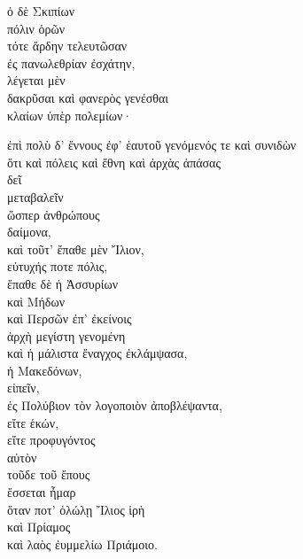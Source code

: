 {\large
\begin{greek}
\noindent  ὁ δὲ Σκιπίων \\
\tabto{2em} πόλιν ὁρῶν\\
\tabto{4em} τότε ἄρδην τελευτῶσαν \\
\tabto{6em} ἐς πανωλεθρίαν ἐσχάτην, \\
λέγεται μὲν \\
\tabto{2em} δακρῦσαι καὶ φανερὸς γενέσθαι \\
\tabto{4em} κλαίων ὑπὲρ πολεμίων·

\tabto{4em} ἐπὶ πολὺ δ' ἔννους ἐφ' ἑαυτοῦ γενόμενός τε καὶ συνιδὼν \\
\tabto{6em} ὅτι καὶ πόλεις καὶ ἔθνη καὶ ἀρχὰς ἁπάσας \\
\tabto{6em} δεῖ \\
\tabto{6em} μεταβαλεῖν \\
\tabto{8em} ὥσπερ ἀνθρώπους \\
\tabto{6em} δαίμονα, \\
\tabto{6em} καὶ τοῦτ' ἔπαθε μὲν Ἴλιον, \\
\tabto{8em} εὐτυχής ποτε πόλις, \\
\tabto{6em} ἔπαθε δὲ ἡ Ἀσσυρίων \\
\tabto{8em} καὶ Μήδων \\
\tabto{8em} καὶ Περσῶν ἐπ' ἐκείνοις \\
\tabto{6em} ἀρχὴ μεγίστη γενομένη \\
\tabto{6em} καὶ ἡ μάλιστα ἔναγχος ἐκλάμψασα, \\
\tabto{8em} ἡ Μακεδόνων, \\
\tabto{2em} εἰπεῖν, \\
\tabto{4em} ἐς Πολύβιον τὸν λογοποιὸν ἀποβλέψαντα,\\
\tabto{4em} εἴτε ἑκών, \\
\tabto{4em} εἴτε προφυγόντος \\
\tabto{6em} αὐτὸν \\
\tabto{4em} τοῦδε τοῦ ἔπους \\
\tabto{4em} ἔσσεται ἦμαρ \\
\tabto{6em} ὅταν ποτ' ὀλώλῃ Ἴλιος ἱρὴ\\
\tabto{6em} καὶ Πρίαμος \\
\tabto{6em} καὶ λαὸς ἐυμμελίω Πριάμοιο.\\

\end{greek}
}

